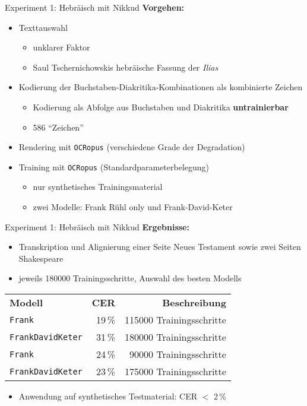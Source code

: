 \documentclass{bbawslides}
\begin{document}
\begin{bbawslide}{Experiment 1: Hebräisch mit Nikkud}
  \vspace*{7mm}%
  \centerslidestrue%
  \textbf{Vorgehen:}
  \begin{itemize}
    \item Texttauswahl
    \begin{itemize}\small
      \item unklarer Faktor
      \item Saul Tschernichowskis hebräische Fassung der \emph{Ilias}
    \end{itemize}
    \item Kodierung der Buchstaben-Diakritika-Kombinationen als kombinierte Zeichen
    \begin{itemize}\small
      \item Kodierung als Abfolge aus Buchstaben und Diakritika \textbf{untrainierbar}
      \item 586 \enquote{Zeichen}
    \end{itemize}
    \item Rendering mit \texttt{OCRopus} (verschiedene Grade der Degradation)
    \item Training mit \texttt{OCRopus} (Standardparameterbelegung)
    \begin{itemize}\small
      \item nur synthetisches Trainingsmaterial
      \item zwei Modelle: Frank Rühl only und Frank-David-Keter
    \end{itemize}
  \end{itemize}
\end{bbawslide}

\begin{bbawslide}{Experiment 1: Hebräisch mit Nikkud}
  \vspace*{7mm}%
  \centerslidestrue%
  \textbf{Ergebnisse:}
  \begin{itemize}
    \item Transkription und Alignierung einer Seite Neues Testament sowie zwei Seiten Shakespeare
    \item jeweils 180000 Trainingsschritte, Auswahl des besten Modells
  \end{itemize}
  \begin{tabular}{lrr}
    \textbf{Modell} & \textbf{CER} & \textbf{Beschreibung}\\
    \texttt{Frank} & 19\,\% & 115000 Trainingsschritte\\
    \texttt{FrankDavidKeter} & 31\,\% & 180000 Trainingsschritte \\
    \hline
    \texttt{Frank} & 24\,\% & 90000 Trainingsschritte\\
    \texttt{FrankDavidKeter} & 23\,\% & 175000 Trainingsschritte \\
  \end{tabular}
  \begin{itemize}
    \item Anwendung auf synthetisches Testmaterial: CER $<$ 2\,\%
  \end{itemize}
\end{bbawslide}
\end{document}
